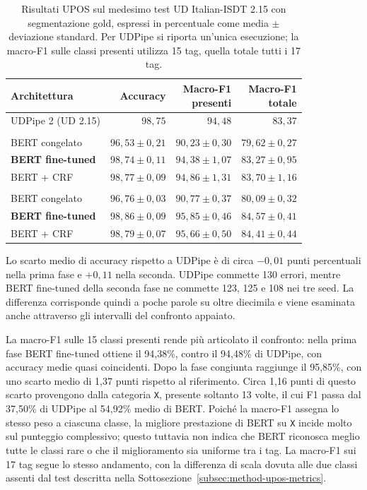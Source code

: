 \documentclass[12pt,a4paper]{report}
\begin{document}
\begin{table}[!htbp]
\centering\small
\begin{tabular}{lrrr}
\toprule
Architettura & Accuracy & \shortstack{Macro-F1\\presenti} & \shortstack{Macro-F1\\totale}\\
\midrule
UDPipe 2 (UD 2.15) & $98{,}75$ & $94{,}48$ & $83{,}37$\\
\midrule
\addlinespace[2pt]
\multicolumn{4}{l}{\textbf{Fase 1: UPOS}}\\
BERT congelato & $96{,}53\pm0{,}21$ & $90{,}23\pm0{,}30$ & $79{,}62\pm0{,}27$\\
\textbf{BERT fine-tuned} & $98{,}74\pm0{,}11$ & $94{,}38\pm1{,}07$ & $83{,}27\pm0{,}95$\\
BERT + CRF & $98{,}77\pm0{,}09$ & $94{,}86\pm1{,}31$ & $83{,}70\pm1{,}16$\\
\midrule
\addlinespace[2pt]
\multicolumn{4}{l}{\textbf{Fase 2: UPOS + \texttt{FEATS}}}\\
BERT congelato & $96{,}76\pm0{,}03$ & $90{,}77\pm0{,}37$ & $80{,}09\pm0{,}32$\\
\textbf{BERT fine-tuned} & $98{,}86\pm0{,}09$ & $95{,}85\pm0{,}46$ & $84{,}57\pm0{,}41$\\
BERT + CRF & $98{,}79\pm0{,}07$ & $95{,}66\pm0{,}50$ & $84{,}41\pm0{,}44$\\
\bottomrule
\end{tabular}
\caption{Risultati UPOS sul medesimo test UD Italian-ISDT 2.15 con segmentazione gold, espressi in percentuale come media $\pm$ deviazione standard. Per UDPipe si riporta un'unica esecuzione; la macro-F1 sulle classi presenti utilizza 15 tag, quella totale tutti i 17 tag.}
\label{tab:results-upos}
\end{table}

Lo scarto medio di accuracy rispetto a UDPipe è di circa $-0{,}01$ punti percentuali nella prima fase e $+0{,}11$ nella seconda. UDPipe commette 130 errori, mentre BERT fine-tuned della seconda fase ne commette 123, 125 e 108 nei tre seed. La differenza corrisponde quindi a poche parole su oltre diecimila e viene esaminata anche attraverso gli intervalli del confronto appaiato.

La macro-F1 sulle 15 classi presenti rende più articolato il confronto: nella prima fase BERT fine-tuned ottiene il 94,38\%, contro il 94,48\% di UDPipe, con accuracy medie quasi coincidenti. Dopo la fase congiunta raggiunge il 95,85\%, con uno scarto medio di 1,37 punti rispetto al riferimento. Circa 1,16 punti di questo scarto provengono dalla categoria \texttt{X}, presente soltanto 13 volte, il cui F1 passa dal 37,50\% di UDPipe al 54,92\% medio di BERT. Poiché la macro-F1 assegna lo stesso peso a ciascuna classe, la migliore prestazione di BERT su \texttt{X} incide molto sul punteggio complessivo; questo tuttavia non indica che BERT riconosca meglio tutte le classi rare o che il miglioramento sia uniforme tra i tag. La macro-F1 sui 17 tag segue lo stesso andamento, con la differenza di scala dovuta alle due classi assenti dal test descritta nella Sottosezione~\ref{subsec:method-upos-metrics}.
\end{document}
